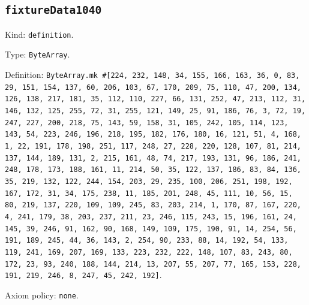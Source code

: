 \documentclass[11pt]{article}
\begin{document}
\subsection*{\texttt{fixtureData1040}}
\noindent Kind: \texttt{definition}.\par
\noindent Type: \texttt{ByteArray}.\par
\noindent Definition: \texttt{ByteArray.mk \#[224, 232, 148, 34, 155, 166, 163, 36, 0, 83, 29, 151, 154, 137, 60, 206, 103, 67, 170, 209, 75, 110, 47, 200, 134, 126, 138, 217, 181, 35, 112, 110, 227, 66, 131, 252, 47, 213, 112, 31, 146, 132, 125, 255, 72, 31, 255, 121, 149, 25, 91, 186, 76, 3, 72, 19, 247, 227, 200, 218, 75, 143, 59, 158, 31, 105, 242, 105, 114, 123, 143, 54, 223, 246, 196, 218, 195, 182, 176, 180, 16, 121, 51, 4, 168, 1, 22, 191, 178, 198, 251, 117, 248, 27, 228, 220, 128, 107, 81, 214, 137, 144, 189, 131, 2, 215, 161, 48, 74, 217, 193, 131, 96, 186, 241, 248, 178, 173, 188, 161, 11, 214, 50, 35, 122, 137, 186, 83, 84, 136, 35, 219, 132, 122, 244, 154, 203, 29, 235, 100, 206, 251, 198, 192, 167, 172, 31, 34, 175, 238, 11, 185, 201, 248, 45, 111, 10, 56, 15, 80, 219, 137, 220, 109, 109, 245, 83, 203, 214, 1, 170, 87, 167, 220, 4, 241, 179, 38, 203, 237, 211, 23, 246, 115, 243, 15, 196, 161, 24, 145, 39, 246, 91, 162, 90, 168, 149, 109, 175, 190, 91, 14, 254, 56, 191, 189, 245, 44, 36, 143, 2, 254, 90, 233, 88, 14, 192, 54, 133, 119, 241, 169, 207, 169, 133, 223, 232, 222, 148, 107, 83, 243, 80, 172, 23, 93, 240, 188, 144, 214, 13, 207, 55, 207, 77, 165, 153, 228, 191, 219, 246, 8, 247, 45, 242, 192]}.\par
\noindent Axiom policy: \texttt{none}.\par
\end{document}
